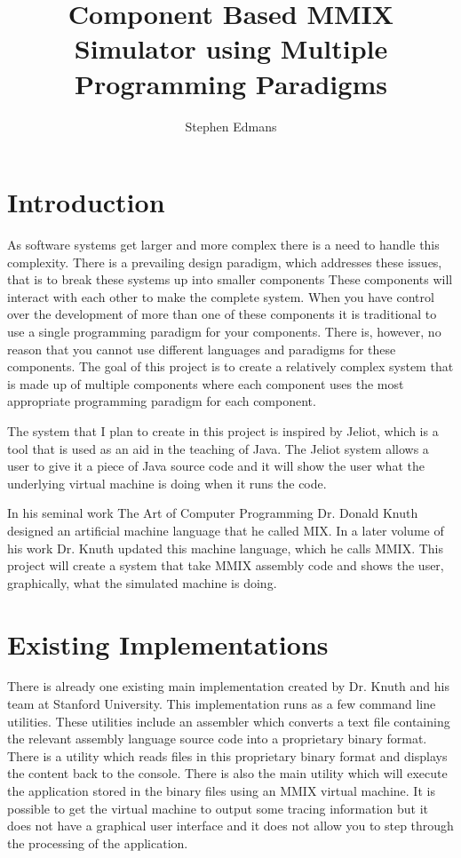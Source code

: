 \documentclass[11pt]{article} %
\title{Component Based MMIX Simulator using Multiple Programming Paradigms}
\author{Stephen Edmans}
\date{} %
\begin{document}
\maketitle
\newpage
\tableofcontents
\newpage
\listoffigures
\newpage
\section{Introduction}
As software systems get larger and more complex there is a need to handle this complexity. There is a prevailing design paradigm, which addresses these issues, that is to break these systems up into smaller components %
These components will interact with each other to make the complete system. When you have control over the development of more than one of these components it is traditional to use a single programming paradigm for your components. There is, however, no reason that you cannot use different languages and paradigms for these components. The goal of this project is to create a relatively complex system that is made up of multiple components where each component uses the most appropriate programming paradigm for each component.

The system that I plan to create in this project is inspired by Jeliot, which is a tool that is used as an aid in the teaching of Java. %
The Jeliot system allows a user to give it a piece of Java source code and it will show the user what the underlying virtual machine is doing when it runs the code.

In his seminal work The Art of Computer Programming Dr. Donald Knuth designed an artificial machine language that he called MIX. In a later volume of his work Dr. Knuth updated this machine language, which he calls MMIX. This project will create a system that take MMIX assembly code and shows the user, graphically, what the simulated machine is doing.


\section{Existing Implementations}

There is already one existing main implementation created by Dr. Knuth and his team at Stanford University. This implementation runs as a few command line utilities.  These utilities include an assembler which converts a text file containing the relevant assembly language source code into a proprietary binary format.  There is a utility which reads files in this proprietary binary format and displays the content back to the console.  There is also the main utility which will execute the application stored in the binary files using an MMIX virtual machine.  It is possible to get the virtual machine to output some tracing information but it does not have a graphical user interface and it does not allow you to step through the processing of the application.  
\end{document}
